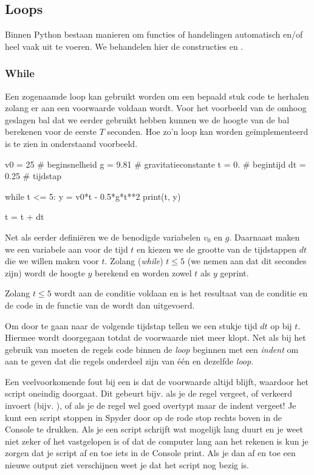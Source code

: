 \documentclass[a4paper,11pt, fleqn]{article}
\begin{document}
\subsection{Loops}
Binnen Python bestaan manieren om functies of handelingen automatisch en/of heel vaak uit te voeren. We behandelen hier de constructies  en .

\subsubsection{While}
Een zogenaamde  loop kan gebruikt worden om een bepaald stuk code te herhalen zolang er aan een voorwaarde voldaan wordt. Voor het voorbeeld van de omhoog geslagen bal dat we eerder gebruikt hebben kunnen we de hoogte van de bal berekenen voor de eerste $T$ seconden. Hoe zo'n loop kan worden ge\"implementeerd is te zien in onderstaand voorbeeld.

\begin{python}
v0 = 25   # beginsnelheid
g = 9.81  # gravitatieconstante
t = 0.    # begintijd
dt = 0.25 # tijdstap

while t <= 5:
    y = v0*t - 0.5*g*t**2
    print(t, y)
    
    t = t + dt
\end{python}

Net als eerder defini\"eren we de benodigde variabelen $v_0$ en $g$. Daarnaast maken we een variabele aan voor de tijd $t$ en kiezen we de grootte van de tijdstappen $dt$ die we willen maken voor $t$. Zolang (\textit{while}) $t \leq 5$ (we nemen aan dat dit secondes zijn)  wordt de hoogte $y$ berekend en worden zowel $t$ als $y$ geprint.

Zolang $t\le5$ wordt aan de conditie voldaan en is het resultaat van de conditie  en de code in de functie van de  wordt dan uitgevoerd.

Om door te gaan naar de volgende tijdstap tellen we een stukje tijd $dt$ op bij $t$. Hiermee wordt doorgegaan totdat de voorwaarde  niet meer klopt. 
Net als bij het gebruik van  moeten de regels code binnen de  \textit{loop} beginnen met een \textit{indent} om aan te geven dat die regels onderdeel zijn van \'e\'en en dezelfde \textit{loop}.

Een veelvoorkomende fout bij een  is dat de voorwaarde altijd  blijft, waardoor het script oneindig doorgaat. Dit gebeurt bijv. als je de regel  vergeet, of verkeerd invoert (bijv. ), of als je de regel wel goed overtypt maar de indent vergeet! Je kunt een script stoppen in Spyder door op de rode stop rechts boven in de Console te drukken. Als je een script schrijft wat mogelijk lang duurt en je weet niet zeker of het vastgelopen is of dat de computer lang aan het rekenen is kun je zorgen dat je script af en toe iets in de Console print. Als je dan af en toe een nieuwe output ziet verschijnen weet je dat het script nog bezig is. 
\end{document}
